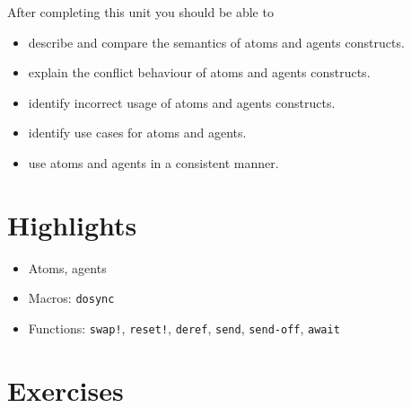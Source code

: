 \documentclass[11pt,a4paper]{article}
\begin{document}
After completing this unit you should be able to

\begin{itemize}
	\item describe and compare the semantics of atoms and agents constructs.
    \item explain the conflict behaviour of atoms and agents constructs.
    \item identify incorrect usage of atoms and agents constructs.
    \item identify use cases for atoms and agents.
    \item use atoms and agents in a consistent manner.
\end{itemize}

\section{Highlights}

\begin{itemize}
    \item Atoms, agents
    \item Macros: \verb|dosync|
    \item Functions: \verb|swap!|, \verb|reset!|, \verb|deref|, \verb|send|, \verb|send-off|, \verb|await|
\end{itemize}



\section{Exercises}
\end{document}
